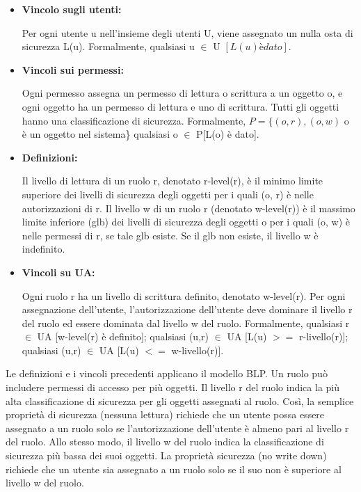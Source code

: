 \begin{itemize}
    \item \textbf{Vincolo sugli utenti:}

    Per ogni utente u nell'insieme degli utenti U, viene assegnato un nulla osta di sicurezza L(u). Formalmente, qualsiasi u $\in$ U $[L(u) è dato]$.
    
    \item \textbf{Vincoli sui permessi:}

    Ogni permesso assegna un permesso di lettura o scrittura a un oggetto o, e ogni oggetto ha un permesso di lettura e uno di scrittura. Tutti gli oggetti hanno una classificazione di sicurezza. Formalmente, $P = \{(o,r),(o,w)$ o è un oggetto nel sistema\} qualsiasi o $\in$ P[L(o) è dato].
    
    \item \textbf{Definizioni:}
    
    Il livello di lettura di un ruolo r, denotato r-level(r), è il minimo limite superiore dei livelli di sicurezza degli oggetti per i quali (o, r) è nelle autorizzazioni di r. Il livello w di un ruolo r (denotato w-level(r)) è il massimo limite inferiore (glb) dei livelli di sicurezza degli oggetti o per i quali (o, w) è nelle permessi di r, se tale glb esiste. Se il glb non esiste, il livello w è indefinito.
    
    \item \textbf{Vincoli su UA:}
    
    Ogni ruolo r ha un livello di scrittura definito, denotato w-level(r). Per ogni assegnazione dell'utente, l'autorizzazione dell'utente deve dominare il livello r del ruolo ed essere dominata dal livello w del ruolo. Formalmente, qualsiasi r $\in$ UA [w-level(r) è definito]; qualsiasi (u,r) $\in$ UA [L(u) $>=$ r-livello(r)]; qualsiasi (u,r) $\in$ UA [L(u) $<=$ w-livello(r)].
    

\end{itemize}
Le definizioni e i vincoli precedenti applicano il modello BLP. Un ruolo può includere permessi di accesso per più oggetti. Il livello r del ruolo indica la più alta classificazione di sicurezza per gli oggetti assegnati al ruolo. Così, la semplice proprietà di sicurezza (nessuna lettura) richiede che un utente possa essere assegnato a un ruolo solo se l'autorizzazione dell'utente è almeno pari al livello r del ruolo. Allo stesso modo, il livello w del ruolo indica la classificazione di sicurezza più bassa dei suoi oggetti. La proprietà sicurezza (no write down) richiede che un utente sia assegnato a un ruolo solo se il suo non è superiore al livello w del ruolo.

